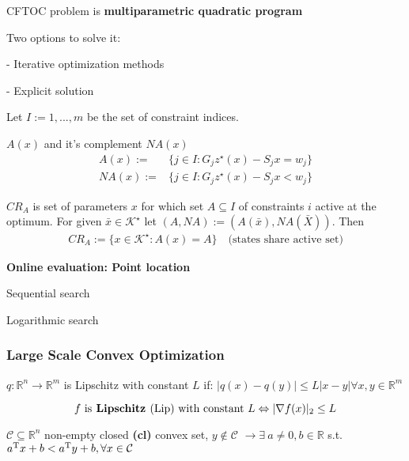 
CFTOC problem is
\textbf{multiparametric quadratic program}

Two options to solve it:

- Iterative optimization methods

- Explicit solution


Let $I := {1, . . . , m}$ be the set of constraint indices.
\begin{definition}
	$A(x)$ and it's complement $NA(x)$
	\begin{align*}
		A(x) :=  & \{j\in I: G_jz^\star(x) - S_jx = w_j \} \\
		NA(x) := & \{j\in I: G_jz^\star(x) - S_jx < w_j \}
	\end{align*}
\end{definition}

\begin{definition}
	$CR_A$ is set of parameters $x$ for which set $A\subseteq I$ of constraints $i$ active at the optimum.
	For given $\bar{x} \in \mathcal{K}^\star$ let $(A,NA) := (A(\bar{x}), NA(\bar{X}))$. Then
	\begin{align*}
		CR_A := \{x\in\mathcal{K}^\star : A(x) = A\} \quad \text{(states share active set)}
	\end{align*}
\end{definition}

\textbf{Online evaluation: Point location}

Sequential search

Logarithmic search



\subsubsection{Large Scale Convex Optimization}

\begin{definition}
	$q: \mathbb{R}^{n} \rightarrow \mathbb{R}^{m}$
	is Lipschitz with constant $L$ if:
	$|q(x)-q(y)| \le L |x-y| \forall x,y \in \mathbb{R}^{m}$
\end{definition}
\vspace{-4mm}
$$f \text{ is\textbf{ Lipschitz }(Lip) with constant } L
	\Leftrightarrow
	|\nabla f(x)|_2\le L$$
\vspace{-4mm}

\begin{theorem}
	$\mathcal{C} \subseteq \mathbb{R}^{n}$ non-empty closed \textbf{(cl)} convex set, $y \notin \mathcal{C}$
	$\rightarrow \exists\ a \ne 0, b \in \mathbb{R}$
	s.t. $a^\textnormal{\scriptsize T} x + b < a^\textnormal{\scriptsize T} y + b,
		\forall x \in \mathcal{C}$
\end{theorem}


